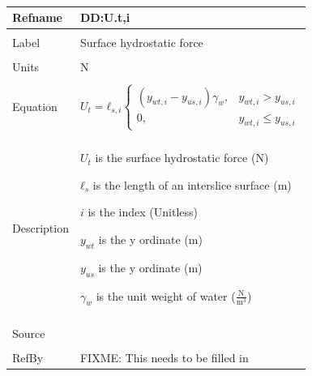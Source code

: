 \documentclass[12pt]{article}
\begin{document}
~\newline
\noindent \begin{minipage}{\textwidth}
\begin{tabular}{p{} p{}}
\toprule \textbf{Refname} & \textbf{DD:U.t,i}
\label{DD:U.t,i}
\\ \midrule \\
Label & Surface hydrostatic force
\\ \midrule \\
Units & N
\\ \midrule \\
Equation & \begin{dmath}
           {U_{t}}={ℓ_{s,i}} \begin{cases}
\left({y_{wt,i}}-{y_{us,i}}\right) {γ_{w}}, & {y_{wt,i}}>{y_{us,i}}\\
0, & {y_{wt,i}}\leq{}{y_{us,i}}
\end{cases}
	   \end{dmath}
\\ \midrule \\
Description & \begin{symbDescription}
              \item{${U_{t}}$ is the surface hydrostatic force (N)}
              \item{${ℓ_{s}}$ is the length of an interslice surface (m)}
              \item{$i$ is the index (Unitless)}
              \item{${y_{wt}}$ is the y ordinate (m)}
              \item{${y_{us}}$ is the y ordinate (m)}
              \item{${γ_{w}}$ is the unit weight of water ($\frac{\text{N}}{\text{m}^{3}}$)}
              \end{symbDescription}
\\ \midrule \\
Source &
\\ \midrule \\
RefBy & FIXME: This needs to be filled in
\\ \bottomrule \end{tabular}
\end{minipage}\\
~\newline
\end{document}
